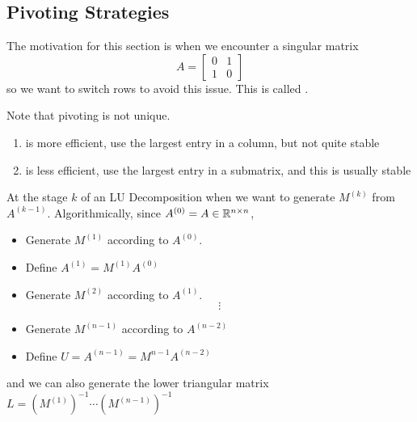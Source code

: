 \documentclass[12pt]{scrartcl}
\begin{document}
\subsection{Pivoting Strategies}

\begin{definition}[Pivoting]
  The motivation for this section is when we encounter a singular matrix 
  \[A = \begin{bmatrix}
    0 & 1\\ 1 & 0
  \end{bmatrix}\]
  so we want to switch rows to avoid this issue. This is called .
\end{definition}

\begin{note}
  Note that pivoting is not unique. 
  \begin{enumerate}
    \item {} is more efficient, use the largest entry in a column, but not quite stable
    \item {} is less efficient, use the largest entry in a submatrix, and this is usually stable
  \end{enumerate}
\end{note}

\begin{definition}
  At the stage $k$ of an LU Decomposition when we want to generate $M^{(k)}$ from $A^{(k-1)}$. Algorithmically, 
  since $A^{(0)} = A \in \mathbb R^{n \times n}$, 
  \begin{itemize}
    \item Generate $M^{(1)}$ according to $A^{(0)}$. 
    \item Define $A^{(1)} = M^{(1)}A^{(0)}$
    \item Generate $M^{(2)}$ according to $A^{(1)}$. 
    \[\vdots\]
    \item Generate $M^{(n-1)}$ according to $A^{(n-2)}$
    \item Define $U = A^{(n-1)} = M^{{n-1}}A^{(n-2)}$
  \end{itemize}
  and we can also generate the lower triangular matrix $L = (M^{(1)})^{-1} \cdots (M^{(n-1)})^{-1}$
\end{definition}
\end{document}
